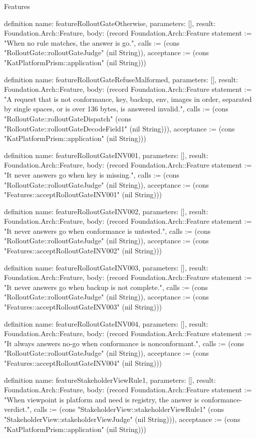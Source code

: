 \begin{lexlean}{Features}
\begin{semanticmodule}
definition{
  name: featureRolloutGateOtherwise,
  parameters: [],
  result: Foundation.Arch::Feature,
  body: (record Foundation.Arch::Feature {statement := "When no rule matches, the answer is go.", calls := (cons "RolloutGate::rolloutGateJudge" (nil String)), acceptance := (cons "KatPlatformPrism::application" (nil String))})
}

definition{
  name: featureRolloutGateRefuseMalformed,
  parameters: [],
  result: Foundation.Arch::Feature,
  body: (record Foundation.Arch::Feature {statement := "A request that is not conformance, key, backup, env, images in order, separated by single spaces, or is over 136 bytes, is answered invalid.", calls := (cons "RolloutGate::rolloutGateDispatch" (cons "RolloutGate::rolloutGateDecodeField1" (nil String))), acceptance := (cons "KatPlatformPrism::application" (nil String))})
}

definition{
  name: featureRolloutGateINV001,
  parameters: [],
  result: Foundation.Arch::Feature,
  body: (record Foundation.Arch::Feature {statement := "It never answers go when key is missing.", calls := (cons "RolloutGate::rolloutGateJudge" (nil String)), acceptance := (cons "Features::acceptRolloutGateINV001" (nil String))})
}

definition{
  name: featureRolloutGateINV002,
  parameters: [],
  result: Foundation.Arch::Feature,
  body: (record Foundation.Arch::Feature {statement := "It never answers go when conformance is untested.", calls := (cons "RolloutGate::rolloutGateJudge" (nil String)), acceptance := (cons "Features::acceptRolloutGateINV002" (nil String))})
}

definition{
  name: featureRolloutGateINV003,
  parameters: [],
  result: Foundation.Arch::Feature,
  body: (record Foundation.Arch::Feature {statement := "It never answers go when backup is not complete.", calls := (cons "RolloutGate::rolloutGateJudge" (nil String)), acceptance := (cons "Features::acceptRolloutGateINV003" (nil String))})
}

definition{
  name: featureRolloutGateINV004,
  parameters: [],
  result: Foundation.Arch::Feature,
  body: (record Foundation.Arch::Feature {statement := "It always answers no-go when conformance is nonconformant.", calls := (cons "RolloutGate::rolloutGateJudge" (nil String)), acceptance := (cons "Features::acceptRolloutGateINV004" (nil String))})
}

definition{
  name: featureStakeholderViewRule1,
  parameters: [],
  result: Foundation.Arch::Feature,
  body: (record Foundation.Arch::Feature {statement := "When viewpoint is platform and need is registry, the answer is conformance-verdict.", calls := (cons "StakeholderView::stakeholderViewRule1" (cons "StakeholderView::stakeholderViewJudge" (nil String))), acceptance := (cons "KatPlatformPrism::application" (nil String))})
}


\end{semanticmodule}
\end{lexlean}

